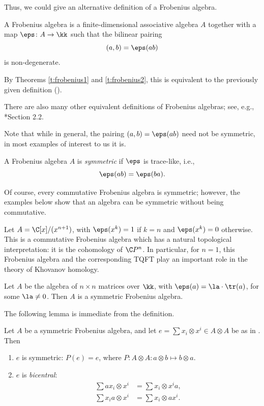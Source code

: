 Thus, we could give an alternative definition of a Frobenius algebra.
\begin{definition}\label{d:frobenius2}
  A Frobenius algebra is a finite-dimensional associative algebra
  $A$ together with a map $\eps \colon A\to \kk$ such that the
  bilinear pairing
  \begin{equation}\label{e:frob_pairing}
    (a,b) = \eps(ab)
  \end{equation}
  is non-degenerate.
\end{definition}
By Theorems \ref{t:frobenius1} and \ref{t:frobenius2}, this is equivalent to the
previously given definition ().

There are also many other equivalent definitions of Frobenius
algebras; see, e.g., *{Section 2.2}.

Note that while in general, the pairing $(a,b) = \eps(ab)$ need not
be symmetric, in most examples of interest to us it is.
\begin{definition}\label{d:frobenius_symmetric}
  A Frobenius algebra $A$ is \emph{symmetric} if $\eps$ is trace-like, i.e.,
  $$
    \eps(ab)=\eps(ba).
  $$
\end{definition}
Of course, every commutative Frobenius algebra is symmetric;
however, the examples below show that an algebra can be
symmetric without being commutative.

\begin{example}\label{x:frobenius1}
  Let $A=\C[x]/(x^{n+1})$, with $\eps(x^k)=1$ if $k=n$ and
  $\eps(x^k)=0$ otherwise. This is a commutative Frobenius algebra which
  has a natural topological interpretation: it is the cohomology of
  $\C P^n$. In particular, for $n=1$, this Frobenius algebra and the
  corresponding TQFT play an important role in the theory of Khovanov
  homology.
\end{example}
\begin{example} \label{x:frobenius2}
  Let $A$ be the algebra of $n\times n$ matrices over $\kk$,
  with $\eps(a)=\la\cdot\tr(a)$, for some $\la\ne 0$. Then $A$
  is a symmetric Frobenius algebra.
\end{example}

The following lemma is immediate from the definition.
\begin{lemma}\label{l:bicentral}
  Let $A$ be  a symmetric Frobenius algebra, and let
  $e=\sum x_i\otimes x^i\in A\otimes A$ be as in . Then
  \begin{enumerate}
    \item $e$ is symmetric: $P(e)=e$, where $P\colon A\otimes A\colon a\otimes
    b\mapsto b\otimes a$.
    \item $e$ is \emph{bicentral}:
    \begin{align*}
      \sum ax_i\otimes x^i&=\sum x_i\otimes x^i a,\\
      \sum x_ia\otimes x^i&=\sum x_i\otimes ax^i.
      \end{align*}
    \end{enumerate}
\end{lemma}
